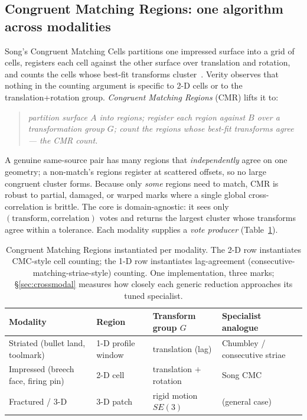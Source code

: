 \documentclass[11pt]{article}
\begin{document}
\subsection{Congruent Matching Regions: one algorithm across modalities}
\label{sec:cmr}
Song's Congruent Matching Cells partitions one impressed surface into a grid of
cells, registers each cell against the other surface over translation and rotation,
and counts the cells whose best-fit transforms cluster~\cite{song2013,song2018}.
Verity observes that nothing in the counting argument is specific to 2-D cells or
to the translation+rotation group. \emph{Congruent Matching Regions} (CMR) lifts it
to:
\begin{quote}\itshape
partition surface $A$ into regions; register each region against $B$ over a
transformation group $G$; count the regions whose best-fit transforms agree --- the
CMR count.
\end{quote}
A genuine same-source pair has many regions that \emph{independently} agree on one
geometry; a non-match's regions register at scattered offsets, so no large
congruent cluster forms. Because only \emph{some} regions need to match, CMR is
robust to partial, damaged, or warped marks where a single global cross-correlation
is brittle. The core is domain-agnostic: it sees only $(\text{transform},
\text{correlation})$ votes and returns the largest cluster whose transforms agree
within a tolerance. Each modality supplies a \emph{vote producer}
(Table~\ref{tab:cmr}).

\begin{table}[t]
  \centering
  \small
  \begin{tabular}{@{}llll@{}}
    \toprule
    \textbf{Modality} & \textbf{Region} & \textbf{Transform group $G$} & \textbf{Specialist analogue} \\
    \midrule
    Striated (bullet land, toolmark) & 1-D profile window & translation (lag) &
      Chumbley / consecutive striae~\cite{chumbley2010} \\
    Impressed (breech face, firing pin) & 2-D cell & translation $+$ rotation &
      Song CMC~\cite{song2013,song2018} \\
    Fractured / 3-D & 3-D patch & rigid motion $SE(3)$ & (general case) \\
    \bottomrule
  \end{tabular}
  \caption{Congruent Matching Regions instantiated per modality. The 2-D row
    instantiates CMC-style cell counting; the 1-D row instantiates lag-agreement
    (consecutive-matching-striae-style) counting. One implementation, three marks;
    \S\ref{sec:crossmodal} measures how closely each generic reduction approaches
    its tuned specialist.}
  \label{tab:cmr}
\end{table}
\end{document}

